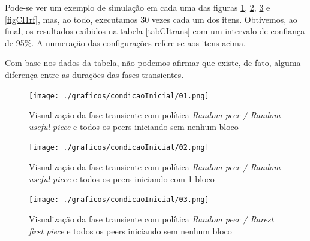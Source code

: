 \documentclass[a4paper,10pt]{article}
\begin{document}
Pode-se ver um exemplo de simulação em cada uma das figuras \ref{figCI0rr}, \ref{figCI1rr}, \ref{figCI0rf} e \ref{figCI1rf}, mas, ao todo, executamos 30 vezes cada um dos itens. Obtivemos, ao final, os resultados exibidos na tabela \ref{tabCItrans} com um intervalo de confiança de 95\%. A numeração das configurações refere-se aos itens acima.

\begin{center}
	\begin{table}[h]
		\caption{Duração da fase transiente com alteração da condição inicial em número de chegadas}
		\label{tabCItrans}
	\end{table}
\end{center}

Com base nos dados da tabela, não podemos afirmar que existe, de fato, alguma diferença entre as durações das fases transientes.

\pagebreak

\begin{figure}
	\caption{Visualização da fase transiente com política \textit{Random peer / Random useful piece} e todos os peers iniciando sem nenhum bloco}
	\label{figCI0rr}
	\texttt{[image: ./graficos/condicaoInicial/01.png]}
\end{figure}

\begin{figure}
	\caption{Visualização da fase transiente com política \textit{Random peer / Random useful piece} e todos os peers iniciando com 1 bloco}
	\label{figCI1rr}
	\texttt{[image: ./graficos/condicaoInicial/02.png]}
\end{figure}

\clearpage
\pagebreak

\begin{figure}
	\caption{Visualização da fase transiente com política \textit{Random peer / Rarest first piece} e todos os peers iniciando sem nenhum bloco}
	\label{figCI0rf}
	\texttt{[image: ./graficos/condicaoInicial/03.png]}
\end{figure}
\end{document}
